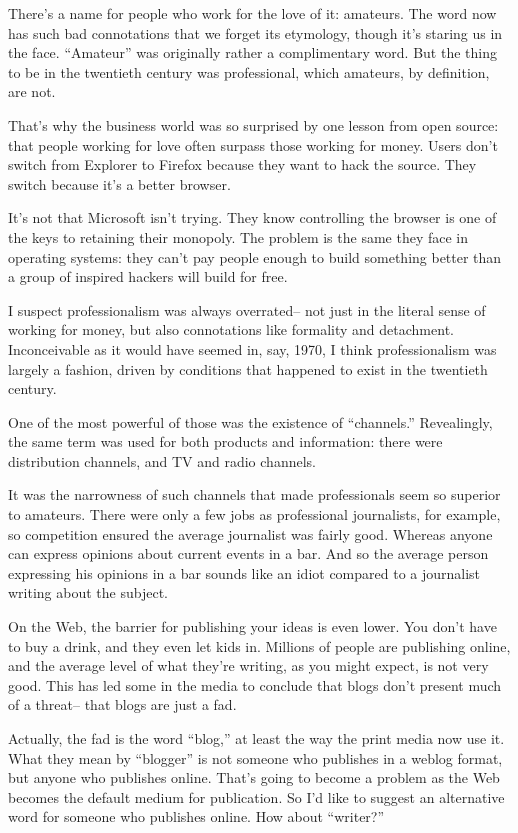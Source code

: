 \documentclass[12pt]{book}
\begin{document}
There's a name for people who work for the love of it: amateurs. The
word now has such bad connotations that we forget its etymology, though
it's staring us in the face. ``Amateur'' was originally rather a
complimentary word. But the thing to be in the twentieth century was
professional, which amateurs, by definition, are not.

That's why the business world was so surprised by one lesson from open
source: that people working for love often surpass those working for
money. Users don't switch from Explorer to Firefox because they want to
hack the source. They switch because it's a better browser.

It's not that Microsoft isn't trying. They know controlling the browser
is one of the keys to retaining their monopoly. The problem is the same
they face in operating systems: they can't pay people enough to build
something better than a group of inspired hackers will build for free.

I suspect professionalism was always overrated-- not just in the literal
sense of working for money, but also connotations like formality and
detachment. Inconceivable as it would have seemed in, say, 1970, I think
professionalism was largely a fashion, driven by conditions that
happened to exist in the twentieth century.

One of the most powerful of those was the existence of ``channels.''
Revealingly, the same term was used for both products and information:
there were distribution channels, and TV and radio channels.

It was the narrowness of such channels that made professionals seem so
superior to amateurs. There were only a few jobs as professional
journalists, for example, so competition ensured the average journalist
was fairly good. Whereas anyone can express opinions about current
events in a bar. And so the average person expressing his opinions in a
bar sounds like an idiot compared to a journalist writing about the
subject.

On the Web, the barrier for publishing your ideas is even lower. You
don't have to buy a drink, and they even let kids in. Millions of people
are publishing online, and the average level of what they're writing, as
you might expect, is not very good. This has led some in the media to
conclude that blogs don't present much of a threat-- that blogs are just
a fad.

Actually, the fad is the word ``blog,'' at least the way the print media
now use it. What they mean by ``blogger'' is not someone who publishes
in a weblog format, but anyone who publishes online. That's going to
become a problem as the Web becomes the default medium for publication.
So I'd like to suggest an alternative word for someone who publishes
online. How about ``writer?''
\end{document}
